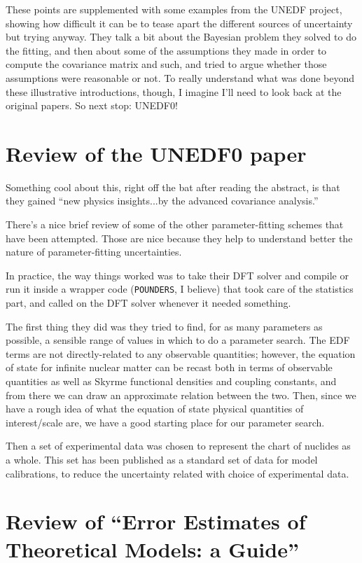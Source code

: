 These points are supplemented with some examples from the UNEDF project, showing how difficult it can be to tease apart the different sources of uncertainty but trying anyway. They talk a bit about the Bayesian problem they solved to do the fitting, and then about some of the assumptions they made in order to compute the covariance matrix and such, and tried to argue whether those assumptions were reasonable or not. To really understand what was done beyond these illustrative introductions, though, I imagine I'll need to look back at the original papers. So next stop: UNEDF0!

\section{Review of the UNEDF0 paper \cite{Kortelainen2008}}

Something cool about this, right off the bat after reading the abstract, is that they gained ``new physics insights...by the advanced covariance analysis.''

There's a nice brief review of some of the other parameter-fitting schemes that have been attempted. Those are nice because they help to understand better the nature of parameter-fitting uncertainties.

In practice, the way things worked was to take their DFT solver and compile or run it inside a wrapper code (\texttt{POUNDERS}, I believe) that took care of the statistics part, and called on the DFT solver whenever it needed something.

The first thing they did was they tried to find, for as many parameters as possible, a sensible range of values in which to do a parameter search. The EDF terms are not directly-related to any observable quantities; however, the equation of state for infinite nuclear matter can be recast both in terms of observable quantities as well as Skyrme functional densities and coupling constants, and from there we can draw an approximate relation between the two. Then, since we have a rough idea of what the equation of state physical quantities of interest/scale are, we have a good starting place for our parameter search.

Then a set of experimental data was chosen to represent the chart of nuclides as a whole. This set has been published as a standard set of data for model calibrations, to reduce the uncertainty related with choice of experimental data.

\section{Review of ``Error Estimates of Theoretical Models: a Guide'' \cite{Dobaczewski2014}}


